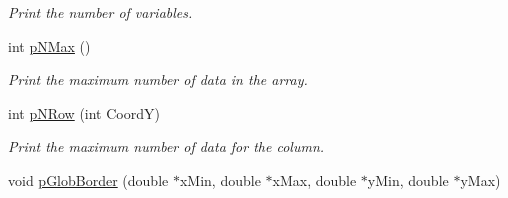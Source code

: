 \begin{DoxyCompactItemize}
\begin{DoxyCompactList}\small\item\em \-Print the number of variables. \end{DoxyCompactList}\item 
\hypertarget{classVarDatFile_a9dcafc8ed48e17a6980b121cb76e56fa}{int \hyperlink{classVarDatFile_a9dcafc8ed48e17a6980b121cb76e56fa}{p\-N\-Max} ()}\label{classVarDatFile_a9dcafc8ed48e17a6980b121cb76e56fa}

\begin{DoxyCompactList}\small\item\em \-Print the maximum number of data in the array. \end{DoxyCompactList}\item 
\hypertarget{classVarDatFile_a48d99b519007370b7b0657a1f6665c27}{int \hyperlink{classVarDatFile_a48d99b519007370b7b0657a1f6665c27}{p\-N\-Row} (int \-Coord\-Y)}\label{classVarDatFile_a48d99b519007370b7b0657a1f6665c27}

\begin{DoxyCompactList}\small\item\em \-Print the maximum number of data for the column. \end{DoxyCompactList}\item 
\hypertarget{classVarDatFile_a8209ef54a8a7b2173ce491cba2008c56}{void \hyperlink{classVarDatFile_a8209ef54a8a7b2173ce491cba2008c56}{p\-Glob\-Border} (double $\ast$x\-Min, double $\ast$x\-Max, double $\ast$y\-Min, double $\ast$y\-Max)}\label{classVarDatFile_a8209ef54a8a7b2173ce491cba2008c56}


\end{DoxyCompactItemize}
